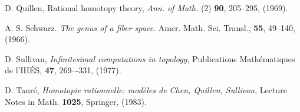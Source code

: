 \begin{thebibliography}{99}
 D. Quillen, Rational homotopy theory, {\em Ann. of Math.} (2) {\bf 90}, 205--295, (1969).

 A. S. Schwarz. {\em The genus of a fiber space}. Amer. Math. Sci. Transl., {\bf 55}, 49--140, (1966).

 D. Sullivan, {\em Infinitesimal computations in topology}, Publications Math\'ematiques de l'IH\'ES, {\bf 47}, 269–-331, (1977).

 D. Tanr{\'e}, \emph{Homotopie rationnelle: mod\`eles de Chen, Quillen, Sullivan}, Lecture Notes in Math. \textbf{1025}, Springer,  (1983).

\end{thebibliography}

